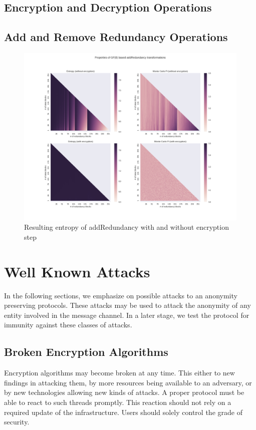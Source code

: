 \section{Encryption and Decryption Operations}
\section{Add and Remove Redundancy Operations}\label{sec:analysisReedSolomon}
\begin{figure}[!t]\centering
	\includegraphics[width=1\textwidth]{inc/randomblock_10kb}
	\caption{Resulting entropy of addRedundancy with and without encryption step}
	\label{fig:entropy}
\end{figure}



\chapter{Well Known Attacks}
In the following sections, we emphasize on possible attacks to an anonymity preserving protocols. These attacks may be used to attack the anonymity of any entity involved in the message channel. In a later stage, we test the protocol for immunity against these classes of attacks.

\section{Broken Encryption Algorithms}
Encryption algorithms may become broken at any time. This either to new findings in attacking them, by more resources being available to an adversary, or by new technologies allowing new kinds of attacks. A proper protocol must be able to react to such threads promptly. This reaction should not rely on a required update of the infrastructure. Users should solely control the grade of security. 

